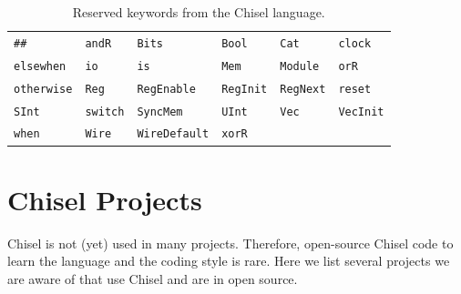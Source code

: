 \documentclass[%
    10pt,
    headinclude, footexclude,
    openright, %
    notitlepage,
    cleardoubleempty,
    headsepline,
    pointlessnumbers,
    bibtotoc, idxtotoc,
    ]{scrbook}
\newcommand{\code}[1]{{\small{\texttt{#1}}}}
\begin{document}
\begin{table}[h]
\centering
\begin{tabular}{llllll}
\code{\#\#}  & \code{andR}  & \code{Bits}  & \code{Bool}  & \code{Cat}  & \code{clock} \\
\code{elsewhen}  & \code{io}  & \code{is}  & \code{Mem}  & \code{Module}  & \code{orR} \\
\code{otherwise}  & \code{Reg}  & \code{RegEnable}  & \code{RegInit}  & \code{RegNext}  & \code{reset} \\
\code{SInt}  & \code{switch}  & \code{SyncMem}  & \code{UInt}  & \code{Vec}  & \code{VecInit} \\
\code{when}  & \code{Wire}  & \code{WireDefault}  & \code{xorR}  & \\
\end{tabular}
\caption{Reserved keywords from the Chisel language.}
\label{tab:reserved:chisel}
\end{table}

\chapter{Chisel Projects}


Chisel is not (yet) used in many projects. Therefore, open-source Chisel code
to learn the language and the coding style is rare. Here we list several projects
we are aware of that use Chisel and are in open source.
\end{document}
